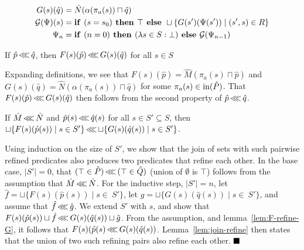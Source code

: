 \begin{align*}
G(s)(\hat q) &= \hat N(\alpha(\pi_{a}(s)) \sqcap \hat q) \\
\mathcal{G}(\Psi)(s) &= \textrm{\textbf{if }} (s = s_{0}) \textrm{\textbf{ then }} \top \textrm{\textbf{ else }} \sqcup \{ G(s')(\Psi(s')) \mid (s',s) \in R \} \\
\Psi_{n} &= \textrm{\textbf{if }} (n = 0) \textrm{\textbf{ then }} (\lambda s \in S : \bot) \textrm{\textbf{ else }} \mathcal{G}(\Psi_{n-1}) \\
\end{align*}



\begin{lemma} \label{lem:F-refine-G}
If $\hat p \operatorname{\lll} \hat q$, then $F(s)(\hat p) \operatorname{\lll} G(s)(\hat q)$ for all $s \in S$
\end{lemma}

Expanding definitions, we see that $F(s)(\hat p) = \hat M(\pi_{a}(s) \sqcap \hat p)$ and $G(s)(\hat q) = \hat N(\alpha(\pi_{a}(s)) \sqcap \hat q)$ for some $\pi_{a}(s) \in \operatorname{in}(\hat P)$. That $F(s)(\hat p) \operatorname{\lll} G(s)(\hat q)$ then follows from the second property of $\hat p \operatorname{\lll} \hat q$.

\begin{lemma} \label{lem:uF-refine-uG}
If $\hat M \operatorname{\lll} \hat N$ and $\hat p(s) \operatorname{\lll} \hat q(s)$ for all $s \in S' \subseteq S$, then $\sqcup \{ F(s)(\hat p(s)) \mid s \in S' \} \operatorname{\lll} \sqcup \{ G(s)(\hat q(s)) \mid s \in S' \}$.
\end{lemma}

Using induction on the size of $S'$, we show that the join of sets with such pairwise refined predicates also produces two predicates that refine each other. In the base case, $| S' | = 0$, that $(\top \in \hat P) \operatorname{\lll} \, (\top \in \hat Q)$ (union of $\emptyset$ is $\top$) follows from the assumption that $\hat M \operatorname{\lll} \hat N$. For the inductive step, $| S' | = n$, let $\hat f = \sqcup \{ F(s)(\hat p(s)) \mid s \in \: S' \}$, let $\hat g = \sqcup \{ G(s)(\hat q(s)) \mid s \in \: S' \}$, and assume that $\hat f \operatorname{\lll} \hat g$. We extend $S'$ with $s$, and show that $F(s)(\hat p(s)) \sqcup \hat f \operatorname{\lll} G(s)(\hat q(s)) \sqcup \hat g$. From the assumption, and lemma~\ref{lem:F-refine-G}, it follows that $F(s)(\hat p(s) \operatorname{\lll} G(s)(\hat q(s))$. Lemma~\ref{lem:join-refine} then states that the union of two such refining pairs also refine each other. $\qedb$

